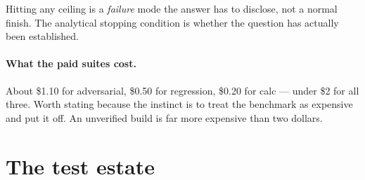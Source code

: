 \documentclass[11pt,a4paper]{report}
\begin{document}
\noindent Hitting any ceiling is a \emph{failure} mode the answer has to disclose, not a normal
finish. The analytical stopping condition is whether the question has actually been established.

\paragraph{What the paid suites cost.} About \$1.10 for adversarial, \$0.50 for regression, \$0.20
for calc --- under \$2 for all three. Worth stating because the instinct is to treat the benchmark
as expensive and put it off. An unverified build is far more expensive than two dollars.

\section{The test estate}
\end{document}
